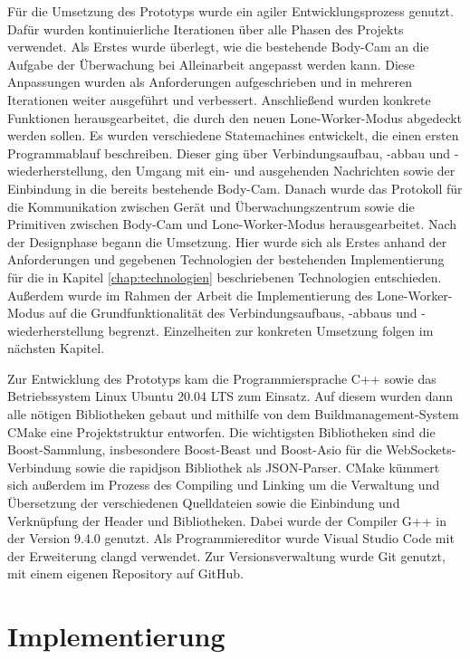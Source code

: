 \documentclass[thesis.tex]{subfiles}
\begin{document}
Für die Umsetzung des Prototyps wurde ein agiler Entwicklungsprozess genutzt.
Dafür wurden kontinuierliche Iterationen über alle Phasen des Projekts verwendet.
Als Erstes wurde überlegt, wie die bestehende Body-Cam an die Aufgabe der Überwachung bei Alleinarbeit angepasst werden kann.
Diese Anpassungen wurden als Anforderungen aufgeschrieben und in mehreren Iterationen weiter ausgeführt und verbessert.
Anschließend wurden konkrete Funktionen herausgearbeitet, die durch den neuen Lone-Worker-Modus abgedeckt werden sollen.
Es wurden verschiedene Statemachines entwickelt, die einen ersten Programmablauf beschreiben.
Dieser ging über Verbindungsaufbau, -abbau und -wiederherstellung, den Umgang mit ein- und ausgehenden Nachrichten sowie der Einbindung in die bereits bestehende Body-Cam.
Danach wurde das Protokoll für die Kommunikation zwischen Gerät und Überwachungszentrum sowie die Primitiven zwischen Body-Cam und Lone-Worker-Modus herausgearbeitet.
Nach der Designphase begann die Umsetzung.
Hier wurde sich als Erstes anhand der Anforderungen und gegebenen Technologien der bestehenden Implementierung für die in Kapitel \autoref{chap:technologien} beschriebenen Technologien entschieden.
Außerdem wurde im Rahmen der Arbeit die Implementierung des Lone-Worker-Modus auf die Grundfunktionalität des Verbindungsaufbaus, -abbaus und -wiederherstellung begrenzt.
Einzelheiten zur konkreten Umsetzung folgen im nächsten Kapitel.

Zur Entwicklung des Prototyps kam die Programmiersprache C++ sowie das Betriebssystem Linux Ubuntu 20.04 LTS zum Einsatz.
Auf diesem wurden dann alle nötigen Bibliotheken gebaut und mithilfe von dem Buildmanagement-System CMake eine Projektstruktur entworfen.
Die wichtigsten Bibliotheken sind die Boost-Sammlung, insbesondere Boost-Beast und Boost-Asio für die WebSockets-Verbindung sowie die \glqq rapidjson\grqq{} Bibliothek als JSON-Parser.
CMake kümmert sich außerdem im Prozess des Compiling und Linking um die Verwaltung und Übersetzung der verschiedenen Quelldateien
sowie die Einbindung und Verknüpfung der Header und Bibliotheken.
Dabei wurde der Compiler G++ in der Version 9.4.0 genutzt.
Als Programmiereditor wurde Visual Studio Code mit der Erweiterung \glqq clangd\grqq{} verwendet.
Zur Versionsverwaltung wurde Git genutzt, mit einem eigenen Repository auf GitHub.

\section{Implementierung}
\end{document}
